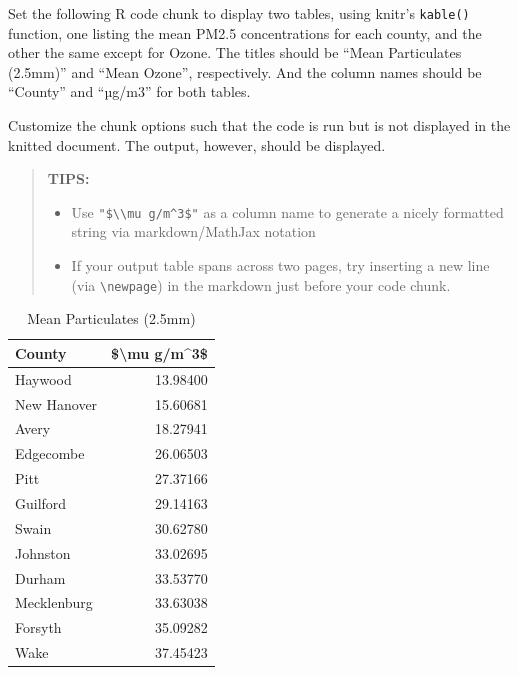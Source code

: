 \documentclass[
]{article}
\begin{document}
Set the following R code chunk to display two tables, using knitr's
\texttt{kable()} function, one listing the mean PM2.5 concentrations for
each county, and the other the same except for Ozone. The titles should
be ``Mean Particulates (2.5mm)'' and ``Mean Ozone'', respectively. And
the column names should be ``County'' and ``µg/m3'' for both tables.

Customize the chunk options such that the code is run but is not
displayed in the knitted document. The output, however, should be
displayed.

\begin{quote}
\textbf{TIPS:}

\begin{itemize}
\item
  Use \texttt{"\$\textbackslash{}\textbackslash{}mu\ g/m\^{}3\$"} as a
  column name to generate a nicely formatted string via markdown/MathJax
  notation
\item
  If your output table spans across two pages, try inserting a new line
  (via \texttt{\textbackslash{}newpage}) in the markdown just before
  your code chunk.
\end{itemize}
\end{quote}

\begin{table}

\caption{\label{tab:data.summary}Mean Particulates (2.5mm)}
\centering
\begin{tabular}[t]{l|r}
\hline
County & \$\textbackslash{}mu g/m\textasciicircum{}3\$\\
\hline
Haywood & 13.98400\\
\hline
New Hanover & 15.60681\\
\hline
Avery & 18.27941\\
\hline
Edgecombe & 26.06503\\
\hline
Pitt & 27.37166\\
\hline
Guilford & 29.14163\\
\hline
Swain & 30.62780\\
\hline
Johnston & 33.02695\\
\hline
Durham & 33.53770\\
\hline
Mecklenburg & 33.63038\\
\hline
Forsyth & 35.09282\\
\hline
Wake & 37.45423\\
\hline
\end{tabular}
\end{table}
\end{document}

